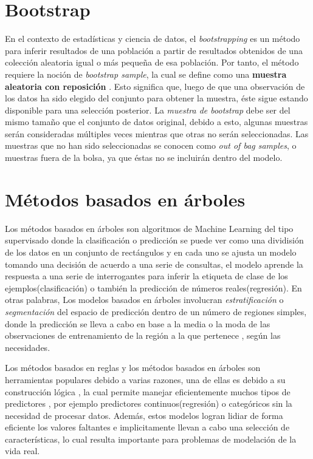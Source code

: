 \section{Bootstrap}
En el contexto de estadísticas y ciencia de datos, el \textit{bootstrapping} es un método para inferir resultados
de una población a partir de resultados obtenidos de una colección aleatoria igual o más pequeña de esa población. Por tanto, 
el método requiere la noción de \textit{bootstrap sample}, la cual se define como una \textbf{muestra aleatoria con reposición}
\cite{17}. Esto significa que, luego de que una observación de los datos ha sido elegido del conjunto para obtener la muestra, éste sigue 
estando disponible para una selección posterior. La \textit{muestra de bootstrap} debe ser del mismo tamaño que el conjunto de datos original\cite{18}, debido a esto, 
algunas muestras serán consideradas múltiples veces mientras que otras no serán seleccionadas. Las muestras que no han sido seleccionadas 
se conocen como \textit{out of bag samples}, o muestras fuera de la bolsa, ya que éstas no se incluirán dentro del modelo.

%
%
%
%
\section{Métodos basados en árboles}

Los métodos basados en árboles son algoritmos de Machine Learning del tipo supervisado donde la  
clasificación o predicción se puede ver como una dividisión de los datos en un conjunto de rectángulos \cite{13} y en
cada uno se ajusta un modelo tomando una decisión de acuerdo a una serie de consultas, el modelo
aprende la respuesta a una serie de interrogantes para inferir la etiqueta de clase de los
ejemplos(clasificación) o también la predicción de números reales(regresión). En otras palabras, 
Los modelos basados en árboles involucran \textit{estratificación} o \textit{segmentación} del 
espacio de predicción dentro de un número de regiones simples, donde la predicción se lleva a cabo 
en base a la media o la moda de las observaciones de entrenamiento de la región a la que pertenece \cite{14}, según las necesidades.

Los métodos basados en reglas y los métodos basados en árboles son herramientas populares debido a varias razones,
una de ellas es debido a su construcción lógica \cite{18}, la cual permite manejar eficientemente muchos tipos de predictores
, por ejemplo predictores continuos(regresión) o categóricos sin la necesidad de procesar datos. Además,
estos modelos logran lidiar de forma eficiente los valores faltantes e implicitamente llevan a cabo una selección de características,
lo cual resulta importante para problemas de modelación de la vida real.

